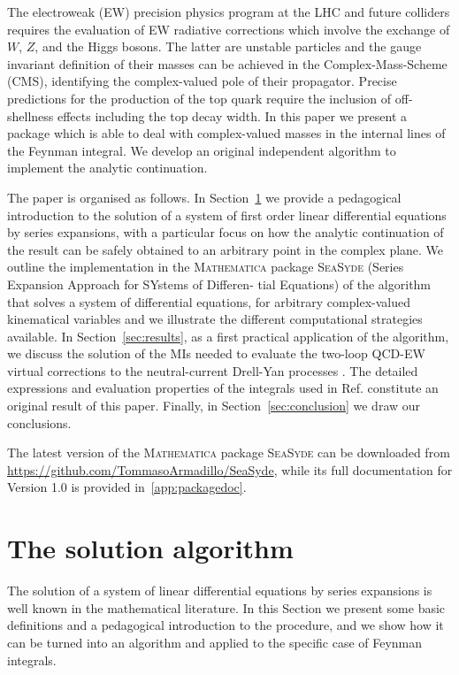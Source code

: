 \documentclass[final,1p,times]{elsarticle}
\begin{document}
 
 The electroweak (EW) precision physics program at the LHC and future colliders requires the evaluation of EW radiative corrections which involve the exchange of $W$, $Z$, and the Higgs bosons. The latter are unstable particles and the gauge invariant definition of their masses can be achieved in the Complex-Mass-Scheme (CMS)\cite{Denner:1999gp,Denner:2005fg}, identifying the complex-valued pole of their propagator. Precise predictions for the production of the top quark require the inclusion of off-shellness effects including the top decay width.
 In this paper we present a package which is able to deal with complex-valued masses in the internal lines of the Feynman integral. We develop an original independent algorithm to implement the analytic continuation.
 


The paper is organised as follows.
In Section~\ref{sec:series} we provide a pedagogical introduction to the solution of a system of first order linear differential equations by series expansions, with a particular focus on how the analytic continuation of the result can be safely obtained to an arbitrary point in the complex plane. 
We outline the implementation in the \textsc{Mathematica} package \textsc{SeaSyde}  (Series Expansion Approach for SYstems of Differen-
tial Equations) of the algorithm that solves a system of differential equations, for arbitrary complex-valued kinematical variables and we illustrate the different computational strategies available.
In Section~\ref{sec:results}, as a first practical application of the algorithm, we discuss the solution of the MIs needed to evaluate the two-loop QCD-EW virtual corrections to the neutral-current Drell-Yan processes \cite{Bonciani:2021zzf,Armadillo:2022bgm}.
The detailed expressions and evaluation properties of the integrals used in Ref.\cite{Armadillo:2022bgm} constitute an original result of this paper.
Finally, in Section~\ref{sec:conclusion} we draw our conclusions.

The latest version of the \textsc{Mathematica} package \textsc{SeaSyde} can be downloaded from \url{https://github.com/TommasoArmadillo/SeaSyde}, while its full documentation for Version 1.0 is provided in~\ref{app:packagedoc}.



\section{The solution algorithm}
\label{sec:series}
The solution of a system of linear differential equations by series expansions is well known in the mathematical literature.
In this Section we present some basic definitions and a pedagogical introduction to the procedure, and we show how it can be turned into an algorithm and applied to the specific case of Feynman integrals.
\end{document}
